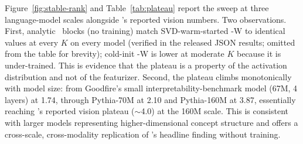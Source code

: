 Figure~\ref{fig:stable-rank} and Table~\ref{tab:plateau} report the sweep at three language-model scales alongside \bsf's reported vision numbers. Two observations. First, analytic \svdomp\ blocks (no training) match SVD-warm-started \bsf-W to identical values at every $K$ on every model (verified in the released JSON results; omitted from the table for brevity); cold-init \bsf-W is lower at moderate $K$ because it is under-trained. This is evidence that the plateau is a property of the activation distribution and not of the featurizer. Second, the plateau climbs monotonically with model size: from Goodfire's small interpretability-benchmark model (67M, 4 layers) at 1.74, through Pythia-70M at 2.10 and Pythia-160M at 3.87, essentially reaching \bsf's reported vision plateau ($\sim$4.0) at the 160M scale. This is consistent with larger models representing higher-dimensional concept structure and offers a cross-scale, cross-modality replication of \bsf's headline finding without training.
